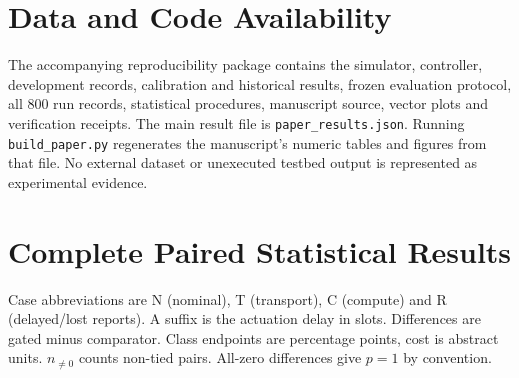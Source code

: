 \documentclass[10pt,a4paper]{article}
\renewcommand{\arraystretch}{1.15}
\begin{document}
\section*{Data and Code Availability}
The accompanying reproducibility package contains the simulator, controller,
development records, calibration and historical results, frozen evaluation
protocol, all 800 run records, statistical procedures, manuscript source,
vector plots and verification receipts. The main result file is
\texttt{paper\_results.json}. Running \texttt{build\_paper.py} regenerates the
manuscript's numeric tables and figures from that file. No external dataset or
unexecuted testbed output is represented as experimental evidence.

\appendix
\section{Complete Paired Statistical Results}\label{app:stats}
Case abbreviations are N (nominal), T (transport), C (compute) and R (delayed/lost
reports). A suffix is the actuation delay in slots. Differences are gated minus
comparator. Class endpoints are percentage points, cost is abstract units.
$n_{\ne0}$ counts non-tied pairs. All-zero differences give $p=1$ by convention.
\small\renewcommand{\arraystretch}{1.05}
\end{document}
